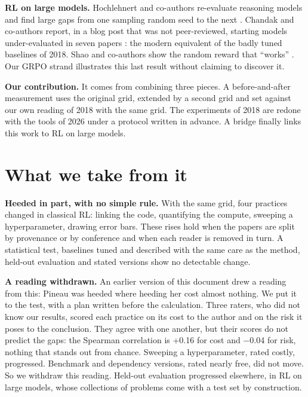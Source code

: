 \documentclass[11pt,a4paper]{article}
\begin{document}
\textbf{RL on large models.} Hochlehnert and co-authors re-evaluate
reasoning models and find large gaps from one sampling random seed to
the next \autocite{hochlehnert2025sober}. Chandak and co-authors report,
in a blog post that was not peer-reviewed, starting models
under-evaluated in seven papers \autocite{chandak2025incorrect}: the
modern equivalent of the badly tuned baselines of 2018. Shao and
co-authors show the random reward that ``works''
\autocite{shao2025spurious}. Our GRPO strand illustrates this last
result without claiming to discover it.

\textbf{Our contribution.} It comes from combining three pieces. A
before-and-after measurement uses the original grid, extended by a
second grid and set against our own reading of 2018 with the same grid.
The experiments of 2018 are redone with the tools of 2026 under a
protocol written in advance. A bridge finally links this work to RL on
large models.

\section{What we take from it}\label{what-we-take-from-it}

\textbf{Heeded in part, with no simple rule.} With the same grid, four
practices changed in classical RL: linking the code, quantifying the
compute, sweeping a hyperparameter, drawing error bars. These rises hold
when the papers are split by provenance or by conference and when each
reader is removed in turn. A statistical test, baselines tuned and
described with the same care as the method, held-out evaluation and
stated versions show no detectable change.

\textbf{A reading withdrawn.} An earlier version of this document drew a
reading from this: Pineau was heeded where heeding her cost almost
nothing. We put it to the test, with a plan written before the
calculation. Three raters, who did not know our results, scored each
practice on its cost to the author and on the risk it poses to the
conclusion. They agree with one another, but their scores do not predict
the gaps: the Spearman correlation is +0.16 for cost and −0.04 for risk,
nothing that stands out from chance. Sweeping a hyperparameter, rated
costly, progressed. Benchmark and dependency versions, rated nearly
free, did not move. So we withdraw this reading. Held-out evaluation
progressed elsewhere, in RL on large models, whose collections of
problems come with a test set by construction.
\end{document}
